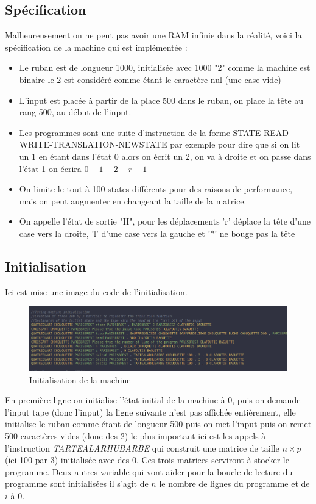 \documentclass[11pt,colorlinks=true,a4paper]{article}
\begin{document}
    \subsection{Spécification}
    Malheureusement on ne peut pas avoir une RAM infinie dans la réalité, voici la spécification de la machine qui est implémentée :
    \begin{itemize}
        \item Le ruban est de longueur 1000, initialisée avec 1000 "2" comme la machine est binaire le 2 est considéré comme étant le caractère 
        nul (une case vide)
        \item L'input est placée à partir de la place 500 dans le ruban, on place la tête au rang 500, au début de l'input.
        \item Les programmes sont une suite d'instruction de la forme STATE-READ-WRITE-TRANSLATION-NEWSTATE par exemple pour dire 
        que si on lit un 1 en étant dans l'état 0 alors on écrit un 2, on va à droite et on passe dans l'état 1 on écrira $0-1-2-r-1$
        \item On limite le tout à 100 states différents pour des raisons de performance, mais on peut augmenter en changeant la taille de la matrice.
        \item On appelle l'état de sortie "H", pour les déplacements 'r' déplace la tête d'une case vers la droite, 'l' d'une case 
        vers la gauche et '*' ne bouge pas la tête
    \end{itemize}
    \subsection{Initialisation}
    Ici est mise une image du code de l'initialisation.
    \begin{figure}[H]
        \begin{center}
        \includegraphics[width=\textwidth]{img/init.png}
        \caption{Initialisation de la machine}
        \end{center}
    \end{figure}
    En première ligne on initialise l'état initial de la machine à 0, puis on demande l'input tape (donc l'input) la ligne suivante n'est 
    pas affichée entièrement, elle initialise le ruban comme étant de longueur 500 puis on met l'input puis on remet 500 caractères vides (donc des 2)
    le plus important ici est les appels à l'instruction \textit{TARTEALARHUBARBE} qui construit une matrice de taille $n\times p$ (ici 100 par 3) initialisée 
    avec des 0. Ces trois matrices serviront à stocker le programme.
    Deux autres variable qui vont aider pour la boucle de lecture du programme sont initialisées il s'agit de $n$ le nombre de lignes du programme et de $i$ à 0. 
\end{document}
